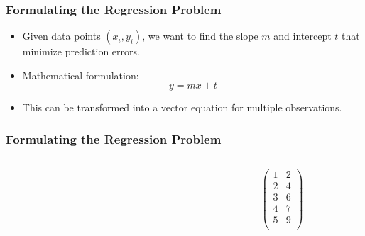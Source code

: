 \documentclass[aspectratio=169]{beamer}
\begin{document}
\begin{frame}
\frametitle{Formulating the Regression Problem}
\begin{itemize}
    \item Given data points \((x_i, y_i)\), we want to find the slope \( m \) and intercept \( t \) that minimize prediction errors.\pause
    \item Mathematical formulation:
    \[
    y = mx + t
    \]\pause
    \item This can be transformed into a vector equation for multiple observations.
\end{itemize}
\end{frame}

\begin{frame}
\frametitle{Formulating the Regression Problem}
\begin{columns}
    \begin{column}{0.5\textwidth}
    \end{column}\pause
    \begin{column}{0.5\textwidth}
        \[ \qquad \qquad \qquad
        \begin{pmatrix}
        1 & 2 \\
        2 & 4 \\
        3 & 6 \\
        4 & 7 \\
        5 & 9 \\
        \end{pmatrix}
        \]
    \end{column}
\end{columns}
\end{frame}
\end{document}
